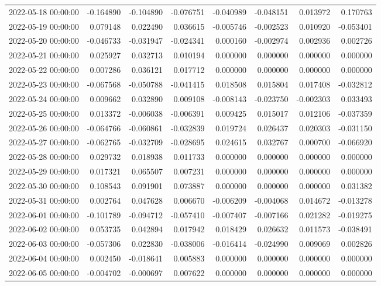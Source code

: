 \begin{tabular}{lrrrrrrr}
2022-05-18 00:00:00 & -0.164890 & -0.104890 & -0.076751 & -0.040989 & -0.048151 & 0.013972 & 0.170763 \\
2022-05-19 00:00:00 & 0.079148 & 0.022490 & 0.036615 & -0.005746 & -0.002523 & 0.010920 & -0.053401 \\
2022-05-20 00:00:00 & -0.046733 & -0.031947 & -0.024341 & 0.000160 & -0.002974 & 0.002936 & 0.002726 \\
2022-05-21 00:00:00 & 0.025927 & 0.032713 & 0.010194 & 0.000000 & 0.000000 & 0.000000 & 0.000000 \\
2022-05-22 00:00:00 & 0.007286 & 0.036121 & 0.017712 & 0.000000 & 0.000000 & 0.000000 & 0.000000 \\
2022-05-23 00:00:00 & -0.067568 & -0.050788 & -0.041415 & 0.018508 & 0.015804 & 0.017408 & -0.032812 \\
2022-05-24 00:00:00 & 0.009662 & 0.032890 & 0.009108 & -0.008143 & -0.023750 & -0.002303 & 0.033493 \\
2022-05-25 00:00:00 & 0.013372 & -0.006038 & -0.006391 & 0.009425 & 0.015017 & 0.012106 & -0.037359 \\
2022-05-26 00:00:00 & -0.064766 & -0.060861 & -0.032839 & 0.019724 & 0.026437 & 0.020303 & -0.031150 \\
2022-05-27 00:00:00 & -0.062765 & -0.032709 & -0.028695 & 0.024615 & 0.032767 & 0.000700 & -0.066920 \\
2022-05-28 00:00:00 & 0.029732 & 0.018938 & 0.011733 & 0.000000 & 0.000000 & 0.000000 & 0.000000 \\
2022-05-29 00:00:00 & 0.017321 & 0.065507 & 0.007231 & 0.000000 & 0.000000 & 0.000000 & 0.000000 \\
2022-05-30 00:00:00 & 0.108543 & 0.091901 & 0.073887 & 0.000000 & 0.000000 & 0.000000 & 0.031382 \\
2022-05-31 00:00:00 & 0.002764 & 0.047628 & 0.006670 & -0.006209 & -0.004068 & 0.014672 & -0.013278 \\
2022-06-01 00:00:00 & -0.101789 & -0.094712 & -0.057410 & -0.007407 & -0.007166 & 0.021282 & -0.019275 \\
2022-06-02 00:00:00 & 0.053735 & 0.042894 & 0.017942 & 0.018429 & 0.026632 & 0.011573 & -0.038491 \\
2022-06-03 00:00:00 & -0.057306 & 0.022830 & -0.038006 & -0.016414 & -0.024990 & 0.009069 & 0.002826 \\
2022-06-04 00:00:00 & 0.002450 & -0.018641 & 0.005883 & 0.000000 & 0.000000 & 0.000000 & 0.000000 \\
2022-06-05 00:00:00 & -0.004702 & -0.000697 & 0.007622 & 0.000000 & 0.000000 & 0.000000 & 0.000000 \\

\end{tabular}
